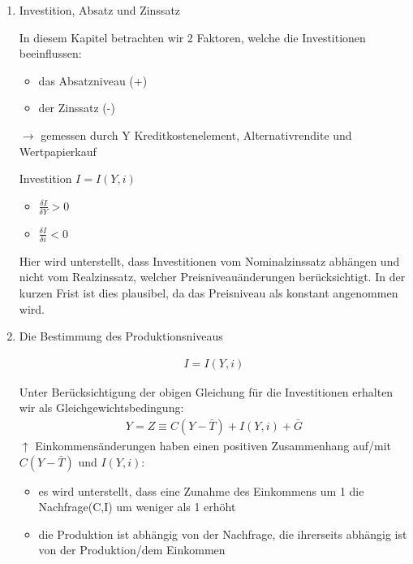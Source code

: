 \documentclass[11pt]{article}
\begin{document}
\begin{enumerate}
\item Investition, Absatz und Zinssatz
\label{sec:orgb5f975f}

In diesem Kapitel betrachten wir 2 Faktoren, welche die Investitionen beeinflussen:
\begin{itemize}
\item das Absatzniveau (+)
\item der Zinssatz (-)
\end{itemize}
\(\rightarrow\) gemessen durch Y Kreditkostenelement, Alternativrendite und Wertpapierkauf

Investition \(I = I(Y,i)\)
\begin{itemize}
\item \(\frac{\delta I}{\delta Y} > 0\)
\item \(\frac{\delta I}{\delta i} < 0\)
\end{itemize}

Hier wird unterstellt, dass Investitionen vom Nominalzinssatz abhängen und nicht vom Realzinssatz, welcher Preisniveauänderungen berücksichtigt. In der kurzen Frist ist dies plausibel, da das Preisniveau als konstant angenommen wird.

\item Die Bestimmung des Produktionsniveaus
\label{sec:org7f4bc27}

\begin{equation*}
\begin{aligned}
I = I(Y,i)
\end{aligned}
\end{equation*}

Unter Berücksichtigung der obigen Gleichung für die Investitionen erhalten wir als Gleichgewichtsbedingung:
\begin{equation*}
\begin{aligned}
Y = Z \equiv C(Y-\bar{T})+I(Y,i)+\bar{G}
\end{aligned}
\end{equation*}
\(\uparrow\) Einkommensänderungen haben einen positiven Zusammenhang auf/mit \(C(Y-\bar{T})\) und \(I(Y,i)\):
\begin{itemize}
\item es wird unterstellt, dass eine Zunahme des Einkommens um 1\texteuro{} die Nachfrage(C,I) um weniger als 1\texteuro{} erhöht
\item die Produktion ist abhängig von der Nachfrage, die ihrerseits abhängig ist von der Produktion/dem Einkommen
\end{itemize}


\end{enumerate}
\end{document}
